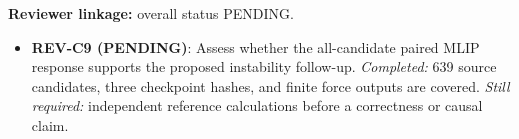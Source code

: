 \textbf{Reviewer linkage:} overall status PENDING.
\begin{itemize}[leftmargin=1.4em,noitemsep]
\item \textbf{REV-C9 (PENDING)}: Assess whether the all-candidate paired MLIP response supports the proposed instability follow-up. \emph{Completed:} 639 source candidates, three checkpoint hashes, and finite force outputs are covered. \emph{Still required:} independent reference calculations before a correctness or causal claim.
\end{itemize}
